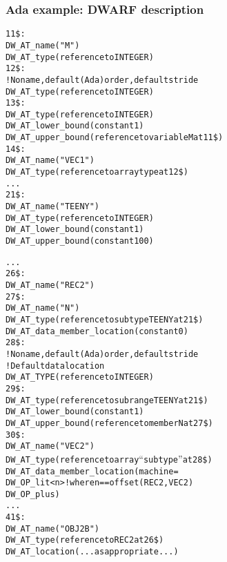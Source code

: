 \subsubsection{Ada example: DWARF description}
\label{app:adaexampledwarfdescription}

\begin{alltt}
11\$: 
        DW\_AT\_name("M")
        DW\_AT\_type(reference to INTEGER)
12\$: 
        ! No name, default (Ada) order, default stride
        DW\_AT\_type(reference to INTEGER)
13\$:    
            DW\_AT\_type(reference to INTEGER)
            DW\_AT\_lower\_bound(constant 1)
            DW\_AT\_upper\_bound(reference to variable M at 11\$)
14\$: 
        DW\_AT\_name("VEC1")
        DW\_AT\_type(reference to array type at 12\$)
    . . .
21\$: 
        DW\_AT\_name("TEENY")
        DW\_AT\_type(reference to INTEGER)
        DW\_AT\_lower\_bound(constant 1)
        DW\_AT\_upper\_bound(constant 100)

      . . .
26\$: 
        DW\_AT\_name("REC2")
27\$:   
            DW\_AT\_name("N")
            DW\_AT\_type(reference to subtype TEENY at 21\$)
            DW\_AT\_data\_member\_location(constant 0)
28\$:   
            ! No name, default (Ada) order, default stride
            ! Default data location
            DW\_AT\_TYPE(reference to INTEGER)
29\$:       
                DW\_AT\_type(reference to subrange TEENY at 21\$)
                DW\_AT\_lower\_bound(constant 1)
                DW\_AT\_upper\_bound(reference to member N at 27\$)
30\$:   
            DW\_AT\_name("VEC2")
            DW\_AT\_type(reference to array “subtype” at 28\$)
            DW\_AT\_data\_member\_location(machine=
                DW\_OP\_lit<n> ! where n == offset(REC2, VEC2)
                DW\_OP\_plus)
      . . .
41\$: 
        DW\_AT\_name("OBJ2B")
        DW\_AT\_type(reference to REC2 at 26\$)
        DW\_AT\_location(...as appropriate...)

\end{alltt}

